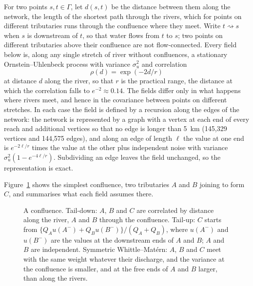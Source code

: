 \documentclass[11pt,a4paper]{article}
\begin{document}
For two points $s, t \in \Gamma$, let $d(s, t)$ be the distance between them along the network, the length of the shortest path through the rivers, which for points on different tributaries runs through the confluence where they meet. Write $t \rightsquigarrow s$ when $s$ is downstream of $t$, so that water flows from $t$ to $s$; two points on different tributaries above their confluence are not flow-connected. Every field below is, along any single stretch of river without confluences, a stationary Ornstein--Uhlenbeck process with variance $\sigma_u^2$ and correlation
\[
\rho(d) = \exp(-2d/r)
\]
at distance $d$ along the river, so that $r$ is the practical range, the distance at which the correlation falls to $e^{-2} \approx 0.14$. The fields differ only in what happens where rivers meet, and hence in the covariance between points on different stretches. In each case the field is defined by a recursion along the edges of the network: the network is represented by a graph with a vertex at each end of every reach and additional vertices so that no edge is longer than 5~km (145{,}329 vertices and 144{,}575 edges), and along an edge of length $\ell$ the value at one end is $e^{-2\ell/r}$ times the value at the other plus independent noise with variance $\sigma_u^2(1 - e^{-4\ell/r})$. Subdividing an edge leaves the field unchanged, so the representation is exact.

Figure~\ref{fig:junction} shows the simplest confluence, two tributaries $A$ and $B$ joining to form $C$, and summarises what each field assumes there.

\begin{figure}[H]
\centering
{}
\caption{A confluence. Tail-down: $A$, $B$ and $C$ are correlated by distance along the river, $A$ and $B$ through the confluence. Tail-up: $C$ starts from $\{Q_A u(A^-) + Q_B u(B^-)\}/(Q_A + Q_B)$, where $u(A^-)$ and $u(B^-)$ are the values at the downstream ends of $A$ and $B$; $A$ and $B$ are independent. Symmetric Whittle--Mat\'ern: $A$, $B$ and $C$ meet with the same weight whatever their discharge, and the variance at the confluence is smaller, and at the free ends of $A$ and $B$ larger, than along the rivers.}
\label{fig:junction}
\end{figure}
\end{document}

